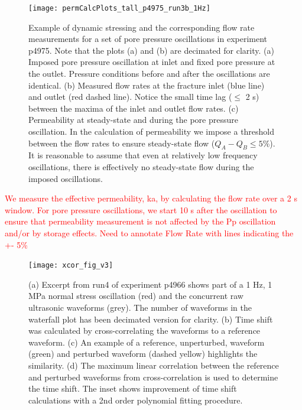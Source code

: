 \documentclass[letterpaper,10pt]{article}
\begin{document}
\newpage

\begin{figure}[ht]
	\centering
	\texttt{[image: permCalcPlots\_tall\_p4975\_run3b\_1Hz]}
	\caption[]{Example of dynamic stressing and the corresponding flow rate measurements for a set of pore pressure oscillations in experiment p4975. Note that the plots (a) and (b) are decimated for clarity. (a) Imposed pore pressure oscillation at inlet and fixed pore pressure at the outlet. Pressure conditions before and after the oscillations are identical. (b) Measured flow rates at the fracture inlet (blue line) and outlet (red dashed line). Notice the small time lag ($\leq$ 2 s) between the maxima of the inlet and outlet flow rates. (c) Permeability at steady-state and during the pore pressure oscillation. In the calculation of permeability we impose a threshold between the flow rates to ensure steady-state flow ($Q_{A} - Q_{B}  \leq 5 \% $). It is reasonable to assume that even at relatively low frequency oscillations, there is effectively no steady-state flow during the imposed oscillations.}
	\label{fig:exp_over}
\end{figure}

\textcolor{red}{We measure the effective permeability, ka, by calculating the flow rate over a 2 s window. For pore pressure oscillations, we start 10 s after the oscillation to ensure that permeability measurement is not affected by the Pp oscillation and/or by storage effects. Need to annotate Flow Rate with lines indicating the +- 5\%}

\newpage

\begin{figure}[ht]
	\centering
	\texttt{[image: xcor\_fig\_v3]}
	\caption[]{(a) Excerpt from run4 of experiment p4966 shows part of a 1 Hz, 1 MPa normal stress oscillation (red) and the concurrent raw ultrasonic waveforms (grey). The number of waveforms in the waterfall plot has been decimated version for clarity. (b) Time shift was calculated by cross-correlating the waveforms to a reference waveform. (c) An example of a reference, unperturbed, waveform (green) and perturbed waveform (dashed yellow) highlights
		the similarity. (d) The maximum linear correlation between the reference and perturbed waveforms from cross-correlation is used to determine the time shift. The inset shows improvement of time shift calculations with a 2nd order polynomial fitting procedure.}
	\label{fig:xcor_poly}
\end{figure}
\end{document}
